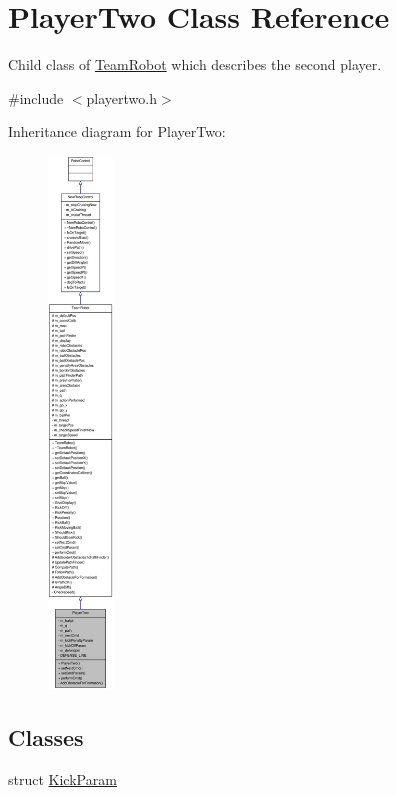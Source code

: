\hypertarget{classPlayerTwo}{
\section{PlayerTwo Class Reference}
\label{classPlayerTwo}
}


Child class of \hyperlink{classTeamRobot}{TeamRobot} which describes the second player.  




{\ttfamily \#include $<$playertwo.h$>$}



Inheritance diagram for PlayerTwo:\nopagebreak
\begin{figure}[H]
\begin{center}
\leavevmode
\includegraphics[height=400pt]{classPlayerTwo__inherit__graph}
\end{center}
\end{figure}
\subsection*{Classes}
\begin{DoxyCompactItemize}
\item 
struct \hyperlink{structPlayerTwo_1_1KickParam}{KickParam}
\end{DoxyCompactItemize}

